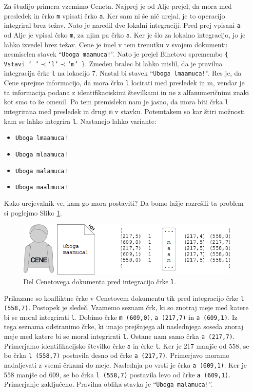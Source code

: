\documentclass[a4paper, 12pt, twoside]{book}
\begin{document}
Za študijo primera vzemimo Ceneta. Najprej je od Alje prejel, da mora med presledek in črko {\tt m} vpisati črko {\tt a}. Ker sam ni še nič urejal, je to operacijo integriral brez težav. Nato je naredil dve lokalni integraciji. Pred prej vpisani {\tt a} od Alje je vpisal črko {\tt m}, za njim pa črko {\tt a}. Ker je šlo za lokalno integracijo, jo je lahko izvedel brez težav. Cene je imel v tem trenutku v svojem dokumentu nesmiselen stavek “{\tt Uboga maamuca!}”. Nato je prejel Binetovo spremembo {\tt \{ Vstavi ‘ ’$\prec$‘l’$\prec$‘m’ \}}. Zmeden bralec bi lahko mislil, da je pravilna integracija črke {\tt l} na lokacijo 7. Nastal bi stavek “{\tt Uboga lmaamuca!}”. Res je, da Cene sprejme informacijo, da mora črko {\tt l} locirati med presledek in m, vendar je ta informacija podana z identifikaciskimi številkami in ne z alfanumeričnimi znaki kot smo to že omenil. Po tem premisleku nam je jasno, da mora biti črka {\tt l} integrirana med presledek in drugi {\tt m} v stavku. Potemtakem so kar štiri možnosti kam se lahko integrira {\tt l}. Nastanejo lahko variante:

\begin{itemize}
	\item {\tt Uboga lmaamuca!}
	\item {\tt Uboga mlaamuca!}
	\item {\tt Uboga malamuca!}
	\item {\tt Uboga maalmuca!}
\end{itemize}

Kako urejevalnik ve, kam go mora postaviti? Da bomo lažje razrešili ta problem si poglejmo Sliko \ref{woot7}.

\begin{figure}[placement h]
\begin{center}
\includegraphics[width=13cm]{woot7.png}
\end{center}
\caption{Del Cenetovega dokumenta pred integracijo črke {\tt l}.}
\label{woot7}
\end{figure}

Prikazane so konfliktne črke v Cenetovem dokumentu tik pred integracijo črke {\tt l (558,7)}. Postopek je sledeč. Vzamemo seznam črk, ki so znotraj meje med katere bi se moral integrirati {\tt l}. Dobimo črke {\tt m (609,0)}, {\tt a (217,7)} in {\tt a (609,1)}. Iz tega seznama odstranimo črke, ki imajo prejšnjega ali naslednjega soseda znoraj meje med katere bi se moral integrirati {\tt l}. Ostane nam samo črka {\tt a (217,7)}. Primerjamo identifikacijsko številko črke {\tt a} in črke {\tt l}. Ker je 217 manjše od 558, se bo črka {\tt l (558,7)} postavila desno od črke {\tt a (217,7)}. Primerjavo moramo nadaljevati z vsemi črkami do meje. Naslednja po vrsti je črka {\tt a (609,1)}. Ker je 558 manjše od 609, se bo črka {\tt l (558,7)} postavila levo od črke {\tt a (609,1)}. Primerjanje zaključeno. Pravilna oblika stavka je “{\tt Uboga malamuca!}”.
\end{document}

